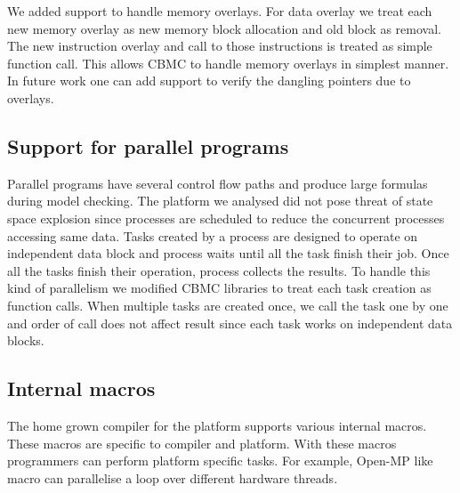 We added support to handle memory overlays. For data overlay we treat each new memory overlay as new memory block allocation and old block as removal. The new instruction overlay and call to those instructions is treated as simple function call. This allows CBMC to handle memory overlays in simplest manner. In future work one can add support to verify the dangling pointers due to overlays.

\subsection{Support for parallel programs}

Parallel programs have several control flow paths and produce large formulas during model checking. The platform we analysed did not pose threat of state space explosion since processes are scheduled to reduce the concurrent processes accessing same data. Tasks created by a process are designed to operate on independent data block and process waits until all the task finish their job. Once all the tasks finish their operation, process collects the results. To handle this kind of parallelism we modified CBMC libraries to treat each task creation as function calls. When multiple tasks are created once, we call the task one by one and order of call does not affect result since each task works on independent data blocks.


\subsection{Internal macros}

The home grown compiler for the platform supports various internal macros. These macros are specific to compiler and platform. With these macros programmers can perform platform specific tasks. For example, Open-MP like macro can parallelise a loop over different hardware threads.


